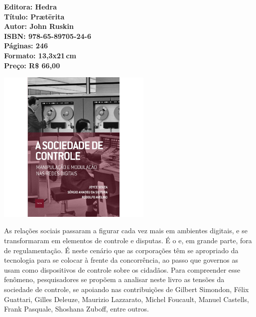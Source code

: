 \vfill
\noindent\begin{minipage}[c]{1\linewidth}
{\small\textbf{
\hspace*{-.1cm}Editora: Hedra\\
Título: Prætērita\\
Autor: John Ruskin\\ 
ISBN: 978-65-89705-24-6\\
Páginas: 246\\
Formato: 13,3x21\,cm\\
Preço: R\$ 66,00\\
}}
\end{minipage}
\pagebreak

\begin{center}
\hspace*{-3.6cm}
\hspace*{3.1cm}\includegraphics[width=74mm]{./CAPAS/HEDRA_SOCIEDADE.jpg}
\end{center}
\hspace*{-7cm}\hrulefill\hspace*{-7cm}
\medskip

\noindent{}As relações sociais passaram a figurar cada vez mais em ambientes digitais, e se transformaram em elementos de controle e disputas. É o  e, em grande parte, fora de regulamentação. É neste cenário que as corporações têm se apropriado da tecnologia para se colocar à frente da concorrência, ao passo que governos as usam como dispositivos de controle sobre os cidadãos. Para compreender esse fenômeno, pesquisadores se propõem a analisar neste livro as tensões da sociedade de controle, se apoiando nas contribuições de Gilbert Simondon, Félix Guattari, Gilles Deleuze, Maurizio Lazzarato, Michel Foucault, Manuel Castells, Frank Pasquale, Shoshana Zuboff, entre outros.

